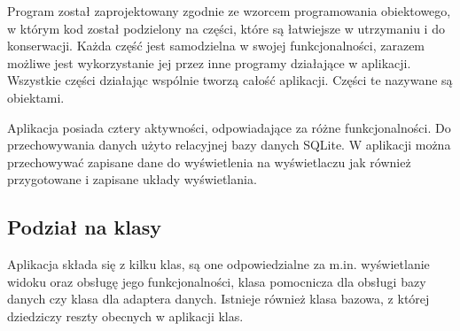 \documentclass[a4paper,12pt, twoside]{article}
\begin{document}
    	Program został zaprojektowany zgodnie ze wzorcem programowania obiektowego\cite{oop}, w którym kod został podzielony na części, które są łatwiejsze w utrzymaniu i do konserwacji. Każda część jest samodzielna w swojej funkcjonalności, zarazem możliwe jest wykorzystanie jej przez inne programy działające w aplikacji. Wszystkie części działając wspólnie tworzą całość aplikacji. Części te nazywane są obiektami. 
    	
    	Aplikacja posiada cztery aktywności, odpowiadające za różne funkcjonalności. Do przechowywania danych użyto relacyjnej bazy danych SQLite. W aplikacji można przechowywać zapisane dane do wyświetlenia na wyświetlaczu jak również przygotowane i zapisane układy wyświetlania.
    	
    	\subsection{Podział na klasy}
    	Aplikacja składa się z kilku klas, są one odpowiedzialne za m.in. wyświetlanie widoku oraz obsługę jego funkcjonalności, klasa pomocnicza dla obsługi bazy danych czy klasa dla adaptera danych. Istnieje również klasa bazowa, z której dziedziczy reszty obecnych w aplikacji klas.
    	
\end{document}
